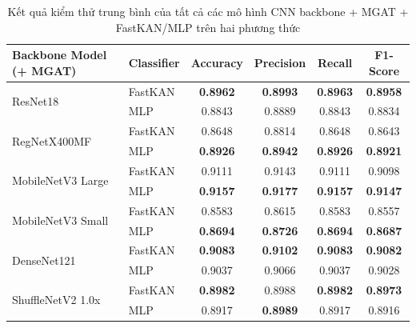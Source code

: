 \begin{table}[H]
\centering
\renewcommand{\arraystretch}{1.2}
\setlength{\tabcolsep}{6pt}
\caption{\centering Kết quả kiểm thử trung bình của tất cả các mô hình CNN backbone + MGAT + FastKAN/MLP trên hai phương thức}
\begin{tabular}{llcccc}
\hline
\textbf{Backbone Model (+ MGAT)} & \textbf{Classifier} & \textbf{Accuracy} & \textbf{Precision} & \textbf{Recall} & \textbf{F1-Score} \\
\hline

\multirow{2}{*}{ResNet18} 
& FastKAN & \textbf{0.8962} & \textbf{0.8993} & \textbf{0.8963} & \textbf{0.8958} \\
& MLP & 0.8843 & 0.8889 & 0.8843 & 0.8834 \\
\hline

\multirow{2}{*}{RegNetX400MF} 
& FastKAN & 0.8648 & 0.8814 & 0.8648 & 0.8643 \\
& MLP & \textbf{0.8926} & \textbf{0.8942} & \textbf{0.8926}
& \textbf{0.8921} \\
\hline

\multirow{2}{*}{MobileNetV3 Large} 
& FastKAN & 0.9111 & 0.9143 & 0.9111 & 0.9098 \\
& MLP & \textbf{0.9157} & \textbf{0.9177} & \textbf{0.9157} & \textbf{0.9147} \\
\hline

\multirow{2}{*}{MobileNetV3 Small} 
& FastKAN & 0.8583 & 0.8615 & 0.8583 & 0.8557 \\
& MLP & \textbf{0.8694} & \textbf{0.8726} & \textbf{0.8694} & \textbf{0.8687} \\
\hline

\multirow{2}{*}{DenseNet121} 
& FastKAN & \textbf{0.9083} & \textbf{0.9102} & \textbf{0.9083} & \textbf{0.9082} \\
& MLP & 0.9037 & 0.9066 & 0.9037 & 0.9028 \\
\hline

\multirow{2}{*}{ShuffleNetV2 1.0x} 
& FastKAN & \textbf{0.8982} & 0.8988 & \textbf{0.8982} & \textbf{0.8973} \\
& MLP & 0.8917 & \textbf{0.8989} & 0.8917 & 0.8916 \\
\hline

\end{tabular}
\label{tab:avg_performance_comparison_v2}
\end{table}

